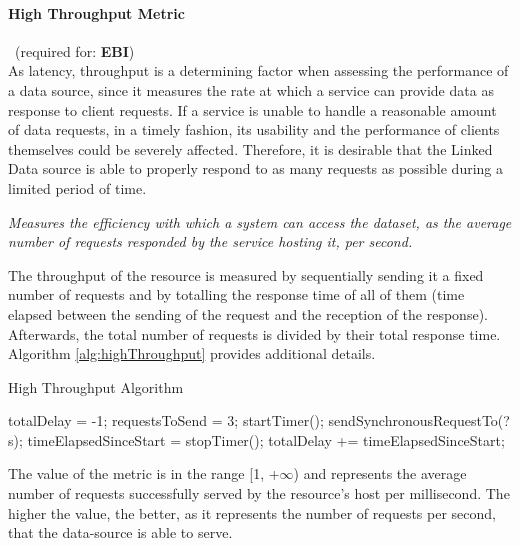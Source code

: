 
\paragraph{High Throughput Metric}~(required for: \textbf{EBI}) ~\\ %
As latency, throughput is a determining factor when assessing the performance of a data source, since it measures the rate at which a service can provide data as response to client requests. If a service is unable to handle a reasonable amount of data requests, in a timely fashion, its usability and the performance of clients themselves could be severely affected. Therefore, it is desirable that the Linked Data source is able to properly respond to as many requests as possible during a limited period of time.
\begin{mdframed}[style=metricdefinition]
\emph{Measures the efficiency with which a system can access the dataset, as the average number of requests responded by the service hosting it, per second.}
\end{mdframed}

The throughput of the resource is measured by sequentially sending it a fixed number of requests and by totalling the response time of all of them (time elapsed between the sending of the request and the reception of the response). Afterwards, the total number of requests is divided by their total response time. Algorithm \ref{alg:highThroughput} provides additional details.
\begin{algorithm}
\caption{High Throughput Algorithm} \label{alg:highThroughput}
\begin{algorithmic}[1]
\State totalDelay = -1;
\State requestsToSend = 3;
\EndProcedure
{}
\State startTimer();
\State sendSynchronousRequestTo(?s);
\EndFor
\State timeElapsedSinceStart = stopTimer();
\State totalDelay += timeElapsedSinceStart;
\EndIf
{}
\EndProcedure
\end{algorithmic}
\end{algorithm}
The value of the metric is in the range [1, +$\infty$) and represents the average number of requests successfully served by the resource's host per millisecond. The higher the value, the better, as it represents the number of requests per second, that the data-source is able to serve.

